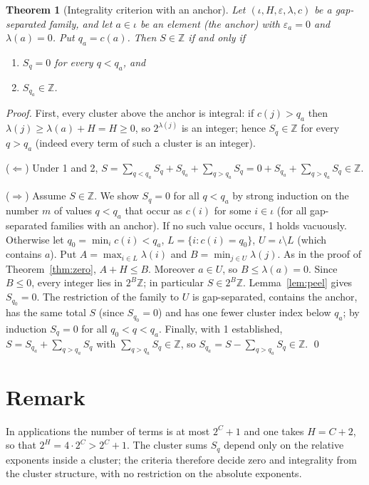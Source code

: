 \documentclass[11pt]{article}
\newtheorem{theorem}{Theorem}
\newcommand{\Z}{\mathbb Z}\newcommand{\Q}{\mathbb Q}\newcommand{\N}{\mathbb N}
\begin{document}
\begin{theorem}[Integrality criterion with an anchor]\label{thm:int}
Let $(\iota,H,\varepsilon,\lambda,c)$ be a gap-separated family, and let $a\in\iota$ be an element (the \emph{anchor}) with $\varepsilon_a=0$ and $\lambda(a)=0$. Put $q_a=c(a)$. Then $S\in\Z$ if and only if
\begin{enumerate}
\item $S_q=0$ for every $q<q_a$, and
\item $S_{q_a}\in\Z$.
\end{enumerate}
\end{theorem}
\begin{proof}
First, every cluster above the anchor is integral: if $c(j)>q_a$ then $\lambda(j)\ge\lambda(a)+H=H\ge0$, so $2^{\lambda(j)}$ is an integer; hence $S_q\in\Z$ for every $q>q_a$ (indeed every term of such a cluster is an integer).

($\Leftarrow$) Under 1 and 2, $S=\sum_{q<q_a}S_q+S_{q_a}+\sum_{q>q_a}S_q=0+S_{q_a}+\sum_{q>q_a}S_q\in\Z$.

($\Rightarrow$) Assume $S\in\Z$. We show $S_q=0$ for all $q<q_a$ by strong induction on the number $m$ of values $q<q_a$ that occur as $c(i)$ for some $i\in\iota$ (for all gap-separated families with an anchor). If no such value occurs, 1 holds vacuously. Otherwise let $q_0=\min_ic(i)<q_a$, $L=\{i:c(i)=q_0\}$, $U=\iota\setminus L$ (which contains $a$). Put $A=\max_{i\in L}\lambda(i)$ and $B=\min_{j\in U}\lambda(j)$. As in the proof of Theorem~\ref{thm:zero}, $A+H\le B$. Moreover $a\in U$, so $B\le\lambda(a)=0$. Since $B\le0$, every integer lies in $2^{B}\Z$; in particular $S\in2^{B}\Z$. Lemma~\ref{lem:peel} gives $S_{q_0}=0$. The restriction of the family to $U$ is gap-separated, contains the anchor, has the same total $S$ (since $S_{q_0}=0$) and has one fewer cluster index below $q_a$; by induction $S_q=0$ for all $q_0<q<q_a$. Finally, with 1 established, $S=S_{q_a}+\sum_{q>q_a}S_q$ with $\sum_{q>q_a}S_q\in\Z$, so $S_{q_a}=S-\sum_{q>q_a}S_q\in\Z$. \qed
\end{proof}

\section{Remark}
In applications the number of terms is at most $2^{C}+1$ and one takes $H=C+2$, so that $2^{H}=4\cdot2^{C}>2^{C}+1$. The cluster sums $S_q$ depend only on the relative exponents inside a cluster; the criteria therefore decide zero and integrality from the cluster structure, with no restriction on the absolute exponents.
\end{document}
